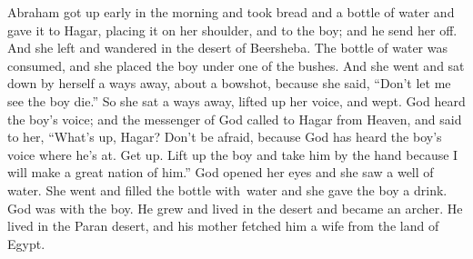 \begin{inparaenum}
   Abraham got up early in the morning and took bread and a bottle of water and gave it to Hagar, placing it on her shoulder, and to the boy; and he send her off. And she left and wandered in the desert of Beersheba.%
   The bottle of water was consumed, and she placed the boy under one of the bushes.%
   And she went and sat down by herself a ways away, about a bowshot, because she said, ``Don't let me see the boy die.'' So she sat a ways away, lifted up her voice, and wept.%
   God heard the boy's voice; and the messenger of God called to Hagar from Heaven, and said to her, ``What's up, Hagar? Don't be afraid, because God has heard the boy's voice where he's at.%
   Get up. Lift up the boy and take him by the hand because I will make a great nation of him.''%
   God opened her eyes and she saw a well of water. She went and filled the bottle with\understood{}\ water and she gave the boy a drink.%
   God was with the boy. He grew and lived in the desert and became an archer.%
   He lived in the Paran desert, and his mother fetched him a wife from the land of Egypt.%


\end{inparaenum}
